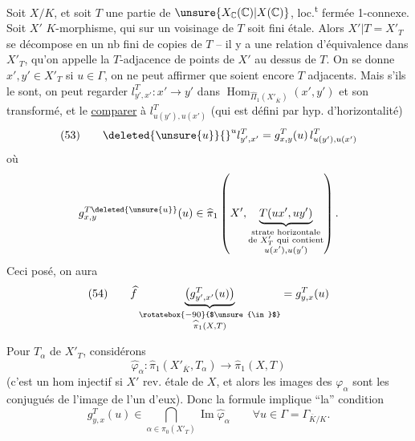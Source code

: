Soit $X/K$, et soit $T$ une partie de $\unsure{X_{\mathbb C}(\mathbb C)|X(\mathbb C)}$, loc.\textsuperscript{t} fermée 1-connexe. Soit $X'$  $K$-morphisme, qui sur  un voisinage de $T$ soit fini étale. Alors $X'\vert T=X'_T$ se décompose en un nb fini de copies de $T$ -- il y a une relation d'équivalence dans $X'_T$, qu'on appelle la $T$-adjacence de points de $X'$ au dessus de $T$. On se donne  $x',y'\in X'_T$  si $u\in\Gamma$, on ne peut affirmer que  soient encore $T$ adjacents.
Mais s'ils le sont, on peut regarder $l^T_{y',x'}:x'\to y'$  dans  $\operatorname{Hom}_{\widehat{\Pi}_1(X'_{\overline K})}(x',y')$ et son transformé,   et le \uline{comparer}  à $l^T_{u(y'),u(x')}$ (qui est défini par hyp. d'horizontalité)
\[
(53)\qquad \deleted{\unsure{u}}{}^u l^T_{y',x'}=g^T_{x,y}(u)\,l^T_{u(y'),u(x')}
\]
où
\[
g^{T\deleted{\unsure{u}}}_{x,y}(u)\in\widehat{\pi}_1\left(X',\underbrace{T(u x',u y')}_{\substack{\text{strate horizontale}\\\text{de }X'_T\text{ qui contient}\\u(x'),u(y')}}\right).
\]
Ceci posé, on aura
\[
(54)\qquad \widehat f\underbrace{\bigl(g^T_{y',x'}(u)\bigr)}_{\substack{\rotatebox{-90}{$\unsure{\in}$}\\\widehat{\pi}_1(X,T)}}=g^T_{y,x}(u)
\]

Pour   $T_\alpha$ de $X'_T$, considérons
\[
\widehat\varphi_\alpha:\widehat\pi_1(X'_{\overline K},T_\alpha)\longrightarrow\widehat\pi_1(X,T)
\]
(c'est un hom injectif si $X'$ rev. étale de $X$, et alors les  images des $\varphi_\alpha$ sont les conjugués de l'image de l'un d'eux). Donc  la formule implique ``la'' condition 
\[
g^T_{y,x}(u)\in\bigcap_{\alpha\in\pi_0(X'_T)}\operatorname{Im}\widehat\varphi_\alpha
\qquad\forall u\in\Gamma=\Gamma_{\overline K/K}.
\]

